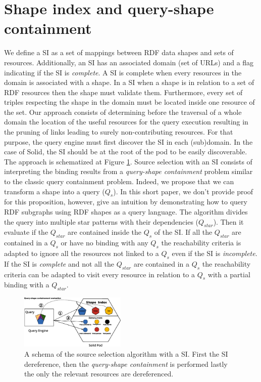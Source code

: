 \section{Shape index and query-shape containment}

We define a SI as a set of mappings between RDF data shapes and sets of resources.
Additionally, an SI has an associated domain (set of URLs)
and a flag indicating if the SI is \emph{complete}.
A SI is complete when every resources in the domain is associated with a shape.
In a SI when a shape is in relation to a set of RDF resources then the shape must validate them.
Furthermore, every set of triples respecting the shape in the domain must be located inside one resource of the set.
Our approach consists of determining before the traversal of a whole domain the location of the useful resources for the query execution
resulting in the pruning of links leading to surely non-contributing resources.
For that purpose, the query engine must first discover the SI in each (sub)domain.
In the case of Solid, the SI should be at the root of the pod to be easily discoverable.
The approach is schematized at Figure \ref{fig:shape_index}.
Source selection with an SI consists of interpreting the binding results from a \emph{query-shape containment} problem similar to the classic query containment problem.
Indeed, we propose that we can transform a shape into a query ($Q_{s}$).
In this short paper, we don't provide proof for this proposition, however, 
\citeauthor{Delva2021} give an intuition by demonstrating how to query RDF subgraphs using RDF shapes as a query language.
The algorithm divides the query into multiple star patterns with their dependencies ($Q_{star}$).
Then it evaluate if the  $Q_{star}$ are contained inside the $Q_s$ of the SI.
If all the $Q_{star}$ are contained in a $Q_{s}$ or have no binding with any $Q_{s}$
the reachability criteria is adapted to ignore all the resources not linked to a $Q_{s}$ even if the SI is \emph{incomplete}.
If the SI is \emph{complete} and not all the $Q_{star}$ are contained in a $Q_{s}$ the reachability criteria can be adapted
to visit every resource in relation to a $Q_{s}$ with a partial binding with a $Q_{star}$.

\begin{figure}
    \centering
    \includegraphics[width=0.45\textwidth]{figure/shape_containement}
    \caption{A schema of the source selection algorithm with a SI. First the SI dereference, 
    then the \emph{query-shape containment} is performed lastly the only the relevant resources are dereferenced.}
    \label{fig:shape_index}
\end{figure}